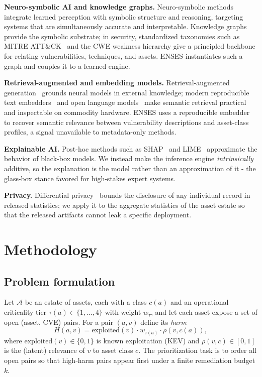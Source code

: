 \documentclass[review,3p,times]{elsarticle}
\begin{document}
\textbf{Neuro-symbolic AI and knowledge graphs.} Neuro-symbolic
methods~\cite{garcez2023neurosymbolic} integrate learned perception with
symbolic structure and reasoning, targeting systems that are simultaneously
accurate and interpretable. Knowledge graphs provide the symbolic substrate;
in security, standardized taxonomies such as MITRE ATT\&CK~\cite{strom2020attack}
and the CWE weakness hierarchy give a principled backbone for relating
vulnerabilities, techniques, and assets. ENSES instantiates such a graph and
couples it to a learned engine.

\textbf{Retrieval-augmented and embedding models.} Retrieval-augmented
generation~\cite{lewis2020rag} grounds neural models in external knowledge;
modern reproducible text embedders~\cite{nussbaum2024nomic} and open language
models~\cite{yang2024qwen2,jiang2023mistral} make semantic retrieval practical
and inspectable on commodity hardware. ENSES uses a reproducible embedder to
recover semantic relevance between vulnerability descriptions and asset-class
profiles, a signal unavailable to metadata-only methods.

\textbf{Explainable AI.} Post-hoc methods such as SHAP~\cite{lundberg2017shap}
and LIME~\cite{ribeiro2016lime} approximate the behavior of black-box models.
We instead make the inference engine \emph{intrinsically} additive, so the
explanation is the model rather than an approximation of it - the
glass-box stance favored for high-stakes expert systems.

\textbf{Privacy.} Differential privacy~\cite{dwork2014dp} bounds the disclosure
of any individual record in released statistics; we apply it to the aggregate
statistics of the asset estate so that the released artifacts cannot leak a
specific deployment.

\section{Methodology}
\label{sec:method}
\subsection{Problem formulation}
Let $\mathcal{A}$ be an estate of assets, each with a class $c(a)$ and an
operational criticality tier $\tau(a)\in\{1,\dots,4\}$ with weight $w_\tau$, and
let each asset expose a set of open (asset, CVE) pairs. For a pair $(a,v)$ define
its \emph{harm}
\begin{equation}
H(a,v) = \mathrm{exploited}(v)\cdot w_{\tau(a)}\cdot \rho(v,c(a)),
\end{equation}
where $\mathrm{exploited}(v)\in\{0,1\}$ is known exploitation (KEV) and
$\rho(v,c)\in[0,1]$ is the (latent) relevance of $v$ to asset class $c$. The
prioritization task is to order all open pairs so that high-harm pairs appear
first under a finite remediation budget $k$.
\end{document}
